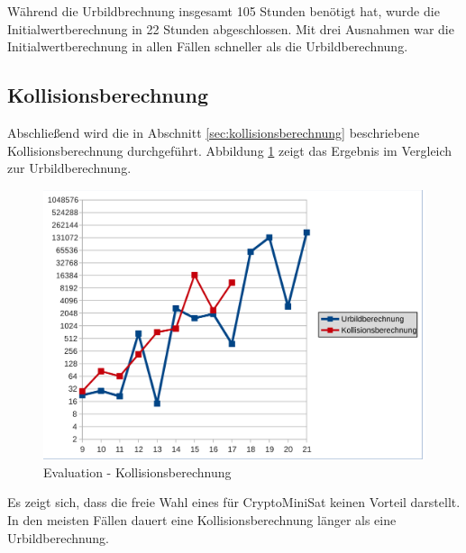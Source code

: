 Während die Urbildbrechnung insgesamt 105 Stunden benötigt hat, wurde die Initialwertberechnung in 22 Stunden
abgeschlossen. Mit drei Ausnahmen war die Initialwertberechnung in allen Fällen schneller als die Urbildberechnung.

\subsection{Kollisionsberechnung}
Abschließend wird die in Abschnitt \ref{sec:kollisionsberechnung} beschriebene Kollisionsberechnung durchgeführt.
Abbildung \ref{fig:eval_kollision} zeigt das Ergebnis im Vergleich zur Urbildberechnung.
\begin{figure}[!h]
  \centering
  \includegraphics[scale=0.55]{images/eval_kollision}
  \caption{Evaluation - Kollisionsberechnung}
  \label{fig:eval_kollision}
\end{figure}

Es zeigt sich, dass die freie Wahl eines  für CryptoMiniSat keinen Vorteil darstellt. In den meisten Fällen
dauert eine Kollisionsberechnung länger als eine Urbildberechnung. 